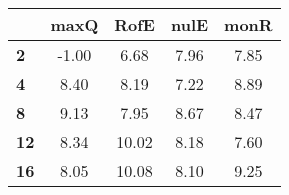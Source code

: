 \begin{tabular}{|l|c|c|c|c|}
\hline
&\textbf{maxQ}&\textbf{RofE}&\textbf{nulE}&\textbf{monR}\\\hline
\textbf{2}&-1.00&6.68&7.96&7.85\\\hline
\textbf{4}&8.40&8.19&7.22&8.89\\\hline
\textbf{8}&9.13&7.95&8.67&8.47\\\hline
\textbf{12}&8.34&10.02&8.18&7.60\\\hline
\textbf{16}&8.05&10.08&8.10&9.25\\\hline
\end{tabular}
